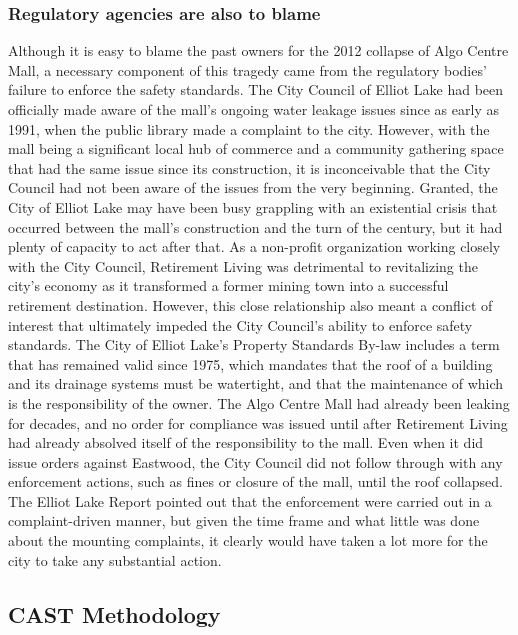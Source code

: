 \documentclass[12pt]{article}
\begin{document}
\subsubsection{Regulatory agencies are also to blame}

Although it is easy to blame the past owners for the 2012 collapse of Algo Centre Mall, a necessary component of this tragedy came from the regulatory bodies' failure to enforce the safety standards. The City Council of Elliot Lake had been officially made aware of the mall's ongoing water leakage issues since as early as 1991, when the public library made a complaint to the city. However, with the mall being a significant local hub of commerce and a community gathering space that had the same issue since its construction, it is inconceivable that the City Council had not been aware of the issues from the very beginning. Granted, the City of Elliot Lake may have been busy grappling with an existential crisis that occurred between the mall's construction and the turn of the century, but it had plenty of capacity to act after that. As a non-profit organization working closely with the City Council, Retirement Living was detrimental to revitalizing the city's economy as it transformed a former mining town into a successful retirement destination. However, this close relationship also meant a conflict of interest that ultimately impeded the City Council's ability to enforce safety standards. The City of Elliot Lake's Property Standards By-law includes a term that has remained valid since 1975, which mandates that the roof of a building and its drainage systems must be watertight, and that the maintenance of which is the responsibility of the owner. The Algo Centre Mall had already been leaking for decades, and no order for compliance was issued until after Retirement Living had already absolved itself of the responsibility to the mall. Even when it did issue orders against Eastwood, the City Council did not follow through with any enforcement actions, such as fines or closure of the mall, until the roof collapsed. The Elliot Lake Report pointed out that the enforcement were carried out in a complaint-driven manner, but given the time frame and what little was done about the mounting complaints, it clearly would have taken a lot more for the city to take any substantial action. 


\subsection{CAST Methodology}
\end{document}
